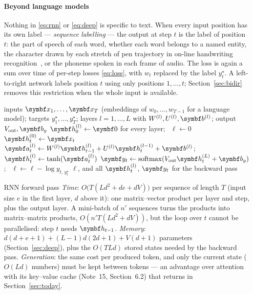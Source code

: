\documentclass[11pt]{article}
\newcommand{\hv}{\vect{h}}
\newcommand{\av}{\vect{a}}
\newcommand{\bv}{\vect{b}}
\newcommand{\yv}{\vect{y}}
\newcommand{\softmax}{\operatorname{softmax}}
\begin{document}
\paragraph{Beyond language models} Nothing in \eqref{eq:rnn} or \eqref{eq:deep} is specific to text. When every input
position has its own label --- \emph{sequence labelling} --- the output at step $t$ is the label of position $t$:
the part of speech of each word, whether each word belongs to a named entity, the character drawn by each stretch of pen
trajectory in on-line handwriting recognition~\cite{graves2009}, or the phoneme spoken in each frame of audio. The loss
is again a sum over time of per-step losses \eqref{eq:loss}, with $w_t$ replaced by the label $y^\star_t$. A
left-to-right network labels position $t$ using only positions $1, \dots, t$; Section~\ref{sec:bidir} removes this
restriction when the whole input is available.

\begin{algorithm}[htbp]
\caption{Forward pass of a deep RNN over one sequence (language model or sequence labelling)}\label{alg:rnnfwd}
\begin{algorithmic}[1]
\Require inputs $\x_1, \dots, \x_T$ (embeddings of $w_0, \dots, w_{T-1}$ for a language model); targets
  $y^\star_1, \dots, y^\star_T$; layers $l = 1, \dots, L$ with $W^{(l)}, U^{(l)}, \bv^{(l)}$; output $V_{\mathrm{out}}, \bv_y$
  \State $\hv^{(l)}_0 \gets \vect{0}$ for every layer; \ $\ell \gets 0$
   
    \State $\hv^{(0)}_t \gets \x_t$
      \State $\av^{(l)}_t \gets W^{(l)}\hv^{(l)}_{t-1} + U^{(l)}\hv^{(l-1)}_t + \bv^{(l)}$; \ $\hv^{(l)}_t \gets \tanh(\av^{(l)}_t)$
    \EndFor
    \State $\yv_t \gets \softmax(V_{\mathrm{out}}\hv^{(L)}_t + \bv_y)$; \ $\ell \gets \ell - \log y_{t,\,y^\star_t}$
  \EndFor
  \State \Return $\ell$, and all $\hv^{(l)}_t$, $\yv_t$ for the backward pass
\EndFunction
\end{algorithmic}
\end{algorithm}

\begin{runtime}{RNN forward pass}
\emph{Time}: $O\big(T(Ld^2 + de + dV)\big)$ per sequence of length $T$ (input size $e$ in the first layer, $d$ above it):
one matrix--vector product per layer and step, plus the output layer. A mini-batch of $n'$ sequences turns the products
into matrix--matrix products, $O(n'T(Ld^2 + dV))$, but the loop over $t$ cannot be parallelised: step $t$ needs
$\hv_{t-1}$. \emph{Memory}: $d(d + e + 1) + (L - 1)d(2d + 1) + V(d + 1)$ parameters (Section~\ref{sec:deep}), plus
the $O(TLd)$ stored states needed by the backward pass. \emph{Generation}: the same cost per produced token, and only the
current state ($O(Ld)$ numbers) must be kept between tokens --- an advantage over attention with its key--value cache
(Note~15, Section~6.2) that returns in Section~\ref{sec:today}.
\end{runtime}
\end{document}
